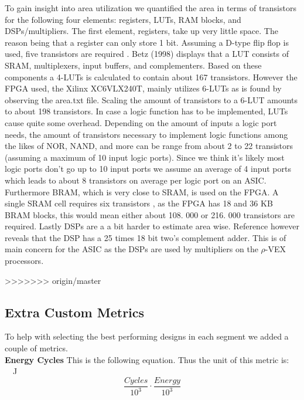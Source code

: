 To gain insight into area utilization we quantified the area in terms of transistors for the following four elements: registers, LUTs, RAM blocks, and DSPs/multipliers.
The first element, registers, take up very little space.
The reason being that a register can only store 1 bit.
Assuming a D-type flip flop is used, five transistors are required \cite{Kumar Chakravarti}.
Betz (1998) displays that a LUT consists of SRAM, multiplexers, input buffers, and complementers.
Based on these components a 4-LUTs is calculated to contain about 167 transistors.
However the FPGA used, the Xilinx XC6VLX240T, mainly utilizes 6-LUTs as is found by observing the area.txt file.
Scaling the amount of transistors to a 6-LUT amounts to about 198 transistors.
In case a logic function has to be implemented, LUTs cause quite some overhead.
Depending on the amount of inputs a logic port needs, the amount of transistors necessary to implement logic functions among the likes of NOR, NAND, and more can be range from about 2 to 22 transistors (assuming a maximum of 10 input logic ports).
Since we think it's likely most logic ports don't go up to 10 input ports we assume an average of 4 input ports which leads to about 8 transistors on average per logic port on an ASIC.
\\
Furthermore BRAM, which is very close to SRAM, is used on the FPGA.
A single SRAM cell requires six transistors \cite{Kumar Chakravarti}, as the FPGA has 18 and 36 KB BRAM blocks, this would mean either about 108.
000 or 216.
000 transistors are required.
Lastly DSPs are a a bit harder to estimate area wise.
Reference{} however reveals that the DSP has a 25 times 18 bit two's complement adder.
This is of main concern for the ASIC as the DSPs are used by multipliers on the $\rho$-VEX processors.

>>>>>>> origin/master


\subsection{Extra Custom Metrics}
\label{ssec:soc-design-extra-custom-metrics}
To help with selecting the best performing designs in each segment we added a couple of metrics.\\


\textbf{Energy Cycles}
This is the following equation. Thus the unit of this metric is: \si{\kilo\cycles\joule}
\begin{equation}
\frac{Cycles}{10^3} \cdot \frac{Energy}{10^3}
\end{equation}

